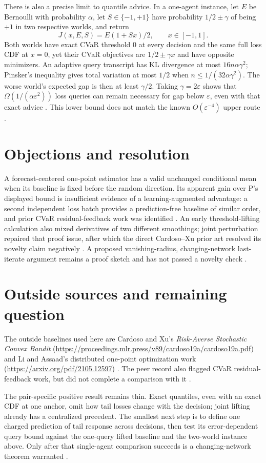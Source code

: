 \documentclass{article}
\begin{document}
There is also a precise limit to quantile advice. In a one-agent instance, let \(E\) be Bernoulli with probability \(\alpha\), let \(S\in\{-1,+1\}\) have probability \(1/2\pm\gamma\) of being \(+1\) in two respective worlds, and return
\[
J(x,E,S)=E(1+Sx)/2,\qquad x\in[-1,1].
\]
Both worlds have exact CVaR threshold \(0\) at every decision and the same full loss CDF at \(x=0\), yet their CVaR objectives are \(1/2\pm\gamma x\) and have opposite minimizers. An adaptive query transcript has KL divergence at most \(16n\alpha\gamma^2\); Pinsker's inequality gives total variation at most \(1/2\) when \(n\leq1/(32\alpha\gamma^2)\). The worse world's expected gap is then at least \(\gamma/2\). Taking \(\gamma=2\varepsilon\) shows that \(\Omega(1/(\alpha\varepsilon^2))\) loss queries can remain necessary for gap below \(\varepsilon\), even with that exact advice . This lower bound does not match the known \(O(\varepsilon^{-4})\) upper route .

\section*{Objections and resolution}

A forecast-centered one-point estimator has a valid unchanged conditional mean when its baseline is fixed before the random direction. Its apparent gain over P's displayed bound is insufficient evidence of a learning-augmented advantage: a second independent loss batch provides a prediction-free baseline of similar order, and prior CVaR residual-feedback work was identified . An early threshold-lifting calculation also mixed derivatives of two different smoothings; joint perturbation repaired that proof issue, after which the direct Cardoso--Xu prior art resolved its novelty claim negatively . A proposed vanishing-radius, changing-network last-iterate argument remains a proof sketch and has not passed a novelty check .

\section*{Outside sources and remaining question}

The outside baselines used here are Cardoso and Xu's \emph{Risk-Averse Stochastic Convex Bandit} (\url{https://proceedings.mlr.press/v89/cardoso19a/cardoso19a.pdf}) and Li and Assaad's distributed one-point optimization work (\url{https://arxiv.org/pdf/2105.12597}) . The peer record also flagged CVaR residual-feedback work, but did not complete a comparison with it .

The pair-specific positive result remains thin. Exact quantiles, even with an exact CDF at one anchor, omit how tail losses change with the decision; joint lifting already has a centralized precedent. The smallest next step is to define one charged prediction of tail response across decisions, then test its error-dependent query bound against the one-query lifted baseline and the two-world instance above. Only after that single-agent comparison succeeds is a changing-network theorem warranted .
\end{document}
